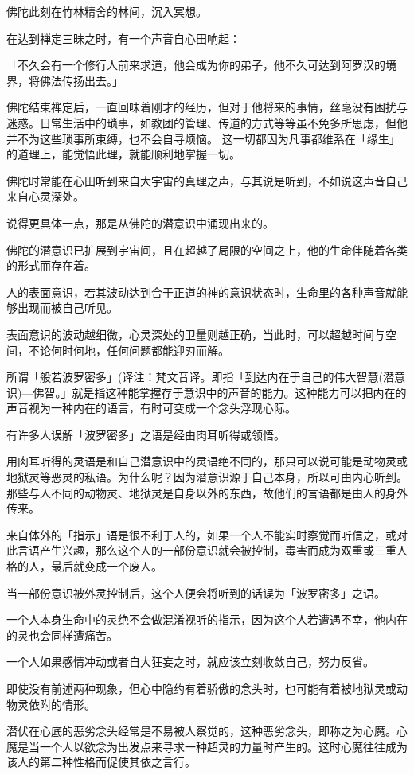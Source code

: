 \documentclass[twoside,openany]{book}
\begin{document}
佛陀此刻在竹林精舍的林间，沉入冥想。

在达到禅定三昧之时，有一个声音自心田响起：

「不久会有一个修行人前来求道，他会成为你的弟子，他不久可达到阿罗汉的境界，将佛法传扬出去。」

佛陀结束禅定后，一直回味着刚才的经历，但对于他将来的事情，丝毫没有困扰与迷惑。日常生活中的琐事，如教团的管理、传道的方式等等虽不免多所思虑，但他并不为这些琐事所束缚，也不会自寻烦恼。
这一切都因为凡事都维系在「缘生」的道理上，能觉悟此理，就能顺利地掌握一切。

佛陀时常能在心田听到来自大宇宙的真理之声，与其说是听到，不如说这声音自己来自心灵深处。

说得更具体一点，那是从佛陀的潜意识中涌现出来的。

佛陀的潜意识已扩展到宇宙间，且在超越了局限的空间之上，他的生命伴随着各类的形式而存在着。

人的表面意识，若其波动达到合于正道的神的意识状态时，生命里的各种声音就能够出现而被自己听见。

表面意识的波动越细微，心灵深处的卫量则越正确，当此时，可以超越时间与空间，不论何时何地，任何问题都能迎刃而解。

所谓「般若波罗密多」(译注：梵文音译。即指「到达内在于自己的伟大智慧(潜意识)—佛智。」就是指这种能掌握存于意识中的声音的能力。这种能力可以把内在的声音视为一种内在的语言，有时可变成一个念头浮现心际。

有许多人误解「波罗密多」之语是经由肉耳听得或领悟。

用肉耳听得的灵语是和自己潜意识中的灵语绝不同的，那只可以说可能是动物灵或地狱灵等恶灵的私语。为什么呢？因为潜意识源于自己本身，所以可由内心听到。那些与人不同的动物灵、地狱灵是自身以外的东西，故他们的言语都是由人的身外传来。

来自体外的「指示」语是很不利于人的，如果一个人不能实时察觉而听信之，或对此言语产生兴趣，那么这个人的一部份意识就会被控制，毒害而成为双重或三重人格的人，最后就变成一个废人。

当一部份意识被外灵控制后，这个人便会将听到的话误为「波罗密多」之语。

一个人本身生命中的灵绝不会做混淆视听的指示，因为这个人若遭遇不幸，他内在的灵也会同样遭痛苦。

一个人如果感情冲动或者自大狂妄之时，就应该立刻收敛自己，努力反省。

即使没有前述两种现象，但心中隐约有着骄傲的念头时，也可能有着被地狱灵或动物灵依附的情形。

潜伏在心底的恶劣念头经常是不易被人察觉的，这种恶劣念头，即称之为心魔。心魔是当一个人以欲念为出发点来寻求一种超灵的力量时产生的。这时心魔往往成为该人的第二种性格而促使其依之言行。
\end{document}
